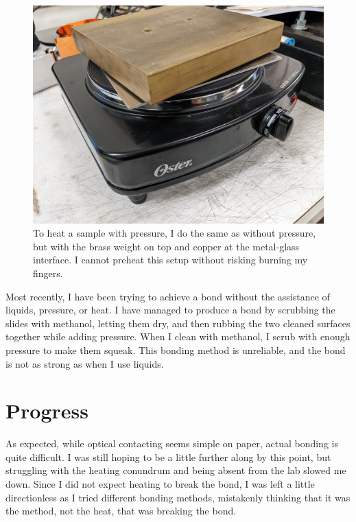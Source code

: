 \documentclass[colorlinks=true,pdfstartview=FitV,linkcolor=blue,
            citecolor=red,urlcolor=magenta]{ligodoc}
\begin{document}
\begin{figure}[htbp]
\begin{center}
\includegraphics[width=6in]{graphics/heat_with_pressure_PXL_20220713_003923957.jpg}
\caption{To heat a sample with pressure, I do the same as without pressure, but with the brass weight on top and copper at the metal-glass interface. I cannot preheat this setup without risking burning my fingers.}
\label{fig:heat_with_pressure}
\end{center}
\end{figure}

Most recently, I have been trying to achieve a bond without the assistance of liquids, pressure, or heat. I have managed to produce a bond by scrubbing the slides with methanol, letting them dry, and then rubbing the two cleaned surfaces together while adding pressure. When I clean with methanol, I scrub with enough pressure to make them squeak. This bonding method is unreliable, and the bond is not as strong as when I use liquids.

\section{Progress}

As expected, while optical contacting seems simple on paper, actual bonding is quite difficult. I was still hoping to be a little further along by this point, but struggling with the heating conundrum and being absent from the lab slowed me down. Since I did not expect heating to break the bond, I was left a little directionless as I tried different bonding methods, mistakenly thinking that it was the method, not the heat, that was breaking the bond.
\end{document}
